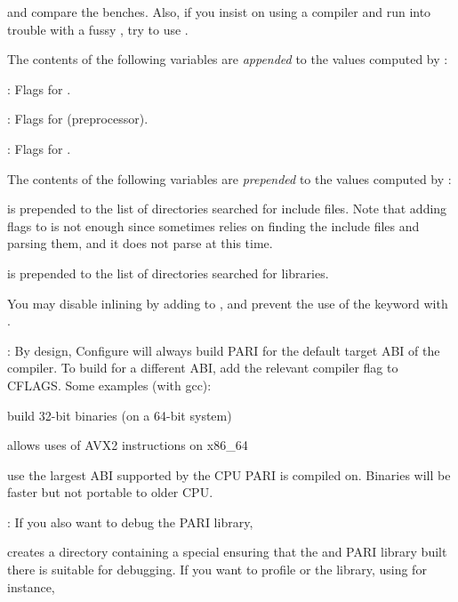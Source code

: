 
\noindent and compare the benches. Also, if you insist on using a 
compiler and run into trouble with a fussy , try to use
.

\noindent The contents of the following variables are \emph{appended} to the
values computed by :

: Flags for .

: Flags for  (preprocessor).

: Flags for .

\noindent The contents of the following variables are \emph{prepended} to
the values computed by :

 is prepended to the list of directories
searched for include files. Note that adding  flags to
 is not enough since  sometimes
relies on finding the include files and parsing them, and it does not
parse  at this time.

 is prepended to the list of directories
searched for libraries.

\noindent You may disable inlining by adding  to
, and prevent the use of the  keyword with
.

: By design, Configure will always build PARI for
the default target ABI of the compiler. To build for a different ABI, add
the relevant compiler flag to CFLAGS. Some examples (with gcc):

 build 32-bit binaries (on a 64-bit system)

 allows uses of AVX2 instructions on x86\_64

 use the largest ABI supported by the CPU PARI
is compiled on. Binaries will be faster but not portable to older CPU.

: If you also want to debug the PARI library,


\noindent creates a directory  containing a special
 ensuring that the  and PARI library built there is
suitable for debugging. If you want to
profile  or the library, using  for instance,

